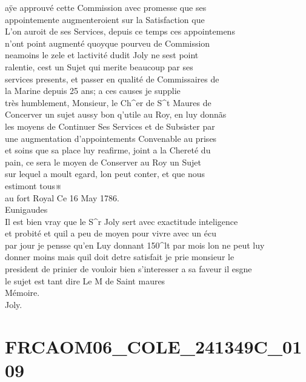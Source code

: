 \documentclass{article}
\begin{document}
\begin{pages}
aÿe approuvé cette Commission avec promesse que ses\\
appointemente augmenteroient sur la Satisfaction que\\
L'on auroit de ses Services, depuis ce temps ces appointemens\\
n'ont point augmenté quoyque pourveu de Commission\\
neamoins le zele et lactivité dudit Joly ne sest point\\
ralentie, cest un Sujet qui merite beaucoup par ses\\
services presents, et passer en qualité de Commissaires de\\
la Marine depuis 25 ans; a ces causes je supplie\\
très humblement, Monsieur, le Ch\^{}er de S\^{}t Maures de\\
Concerver un sujet aussy bon q'utile au Roy, en luy donnãs\\
les moyens de Continuer Ses Services et de Subsister par\\
une augmentation d'appointements Convenable au prises\\
et soins que sa place luy reafirme, joint a la Chereté du\\
pain, ce sera le moyen de Conserver au Roy un Sujet\\
sur lequel a moult egard, lon peut conter, et que nous\\
estimont tous※\\
au fort Royal Ce 16 May 1786.\\
Eunigaudes\\
Il est bien vray que le S\^{}r Joly sert avec exactitude inteligence\\
et probité et quil a peu de moyen pour vivre avec un écu\\
par jour je pensse qu'en Luy donnant 150\^{}lt par mois lon ne peut luy\\
donner moins mais quil doit detre satisfait je prie monsieur le\\
president de prinier de vouloir bien s'interesser a sa faveur il esgne\\
le sujet est tant dire Le M de Saint maures
\pend\pstart
\\
Mémoire.\\
Joly.
\pend
\endnumbering\beginnumbering\section{FRCAOM06\_COLE\_241349C\_0109}\pstart
\\

\end{pages}
\end{document}
